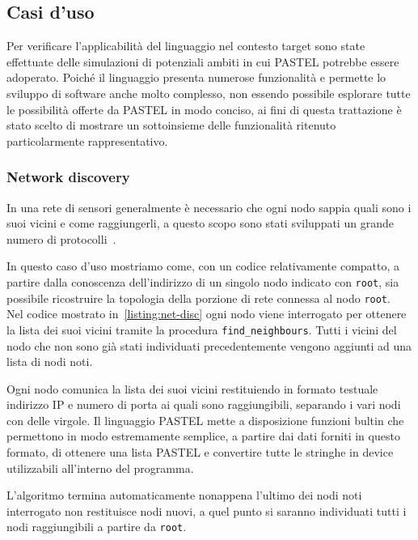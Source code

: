 \documentclass[10pt]{article}
\begin{document}
\subsection{Casi d'uso}\label{subsection:casi-d_uso}
Per verificare l'applicabilità del linguaggio nel contesto target sono state effettuate delle simulazioni di potenziali ambiti in cui PASTEL potrebbe essere adoperato. Poiché il linguaggio presenta numerose funzionalità e permette lo sviluppo di software anche molto complesso, non essendo possibile esplorare tutte le possibilità offerte da PASTEL in modo conciso, ai fini di questa trattazione è stato scelto di mostrare un sottoinsieme delle funzionalità ritenuto particolarmente rappresentativo.

\subsubsection{Network discovery}\label{subsubsection:net-disc}
In una rete di sensori generalmente è necessario che ogni nodo sappia quali sono i suoi vicini e come raggiungerli, a questo scopo sono stati sviluppati un grande numero di protocolli~\cite{narten1998neighbor, kandhalu2010u, alsa2012secure}.

In questo caso d'uso mostriamo come, con un codice relativamente compatto, a partire dalla conoscenza dell'indirizzo di un singolo nodo indicato con \texttt{root}, sia possibile ricostruire la topologia della porzione di rete connessa al nodo \texttt{root}.\\
Nel codice mostrato in~\ref{listing:net-disc} ogni nodo viene interrogato per ottenere la lista dei suoi vicini tramite la procedura \texttt{find\_neighbours}. Tutti i vicini del nodo che non sono già stati individuati precedentemente vengono aggiunti ad una lista di nodi noti.

Ogni nodo comunica la lista dei suoi vicini restituiendo in formato testuale indirizzo IP e numero di porta ai quali sono raggiungibili, separando i vari nodi con delle virgole. Il linguaggio PASTEL mette a disposizione funzioni bultin che permettono in modo estremamente semplice, a partire dai dati forniti in questo formato, di ottenere una lista PASTEL e convertire tutte le stringhe in device utilizzabili all'interno del programma.

L'algoritmo termina automaticamente nonappena l'ultimo dei nodi noti interrogato non restituisce nodi nuovi, a quel punto si saranno individuati tutti i nodi raggiungibili a partire da \texttt{root}.
\end{document}
